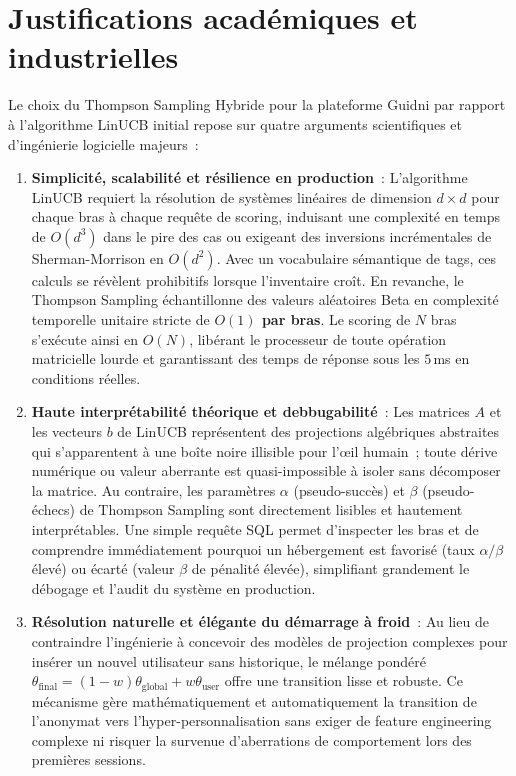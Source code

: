 \section{Justifications académiques et industrielles}

Le choix du Thompson Sampling Hybride pour la plateforme Guidni par rapport à l'algorithme LinUCB initial repose sur quatre arguments scientifiques et d'ingénierie logicielle majeurs~:

\begin{enumerate}
    \item \textbf{Simplicité, scalabilité et résilience en production}~: 
    L'algorithme LinUCB requiert la résolution de systèmes linéaires de dimension $d \times d$ pour chaque bras à chaque requête de scoring, induisant une complexité en temps de $O(d^3)$ dans le pire des cas ou exigeant des inversions incrémentales de Sherman-Morrison en $O(d^2)$. Avec un vocabulaire sémantique de tags, ces calculs se révèlent prohibitifs lorsque l'inventaire croît. En revanche, le Thompson Sampling échantillonne des valeurs aléatoires Beta en complexité temporelle unitaire stricte de \textbf{$O(1)$ par bras}. Le scoring de $N$ bras s'exécute ainsi en $O(N)$, libérant le processeur de toute opération matricielle lourde et garantissant des temps de réponse sous les $5$\,ms en conditions réelles.
    
    \item \textbf{Haute interprétabilité théorique et debbugabilité}~: 
    Les matrices $A$ et les vecteurs $b$ de LinUCB représentent des projections algébriques abstraites qui s'apparentent à une \og{}boîte noire\fg{} illisible pour l'œil humain~; toute dérive numérique ou valeur aberrante est quasi-impossible à isoler sans décomposer la matrice. Au contraire, les paramètres $\alpha$ (pseudo-succès) et $\beta$ (pseudo-échecs) de Thompson Sampling sont directement lisibles et hautement interprétables. Une simple requête SQL permet d'inspecter les bras et de comprendre immédiatement pourquoi un hébergement est favorisé (taux $\alpha/\beta$ élevé) ou écarté (valeur $\beta$ de pénalité élevée), simplifiant grandement le débogage et l'audit du système en production.
    
    \item \textbf{Résolution naturelle et élégante du démarrage à froid}~: 
    Au lieu de contraindre l'ingénierie à concevoir des modèles de projection complexes pour insérer un nouvel utilisateur sans historique, le mélange pondéré $\theta_{\text{final}} = (1-w)\theta_{\text{global}} + w\theta_{\text{user}}$ offre une transition lisse et robuste. Ce mécanisme gère mathématiquement et automatiquement la transition de l'anonymat vers l'hyper-personnalisation sans exiger de feature engineering complexe ni risquer la survenue d'aberrations de comportement lors des premières sessions.
    

\end{enumerate}
